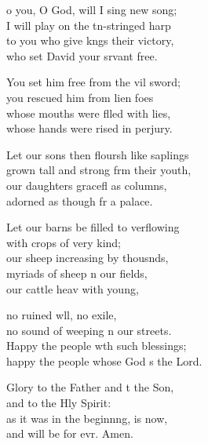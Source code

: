 \settowidth{\versewidth}{Let our sons then flourish like saplings *}
\begin{psalmverse}%
  \begin{patverse}
o you, O God, will I sing  new song;\Med\\
I will play on the tn-stringed harp\\
to you who give k\pointup{\i}ngs their victory,\Med\\
who set David your srvant free.

You set him free from the vil sword;\Med\\
you rescued him from lien foes\\
whose mouths were f\pointup{\i}lled with lies,\Med\\
whose hands were rised in perjury.

Let our sons then flour\pointup{\i}sh like saplings\Med\\
grown tall and strong frm their youth,\\
our daughters gracefl as columns,\Med\\
adorned as though fr a palace.

Let our barns be filled to verflowing\Med\\
with crops of very kind;\\
our sheep increasing by thousnds,\Flex\\
myriads of sheep \pointup{\i}n our fields,\Med\\
our cattle heav with young,

no ruined wll, no exile,\Med\\
no sound of weeping \pointup{\i}n our streets.\\
Happy the people w\pointup{\i}th such blessings;\Med\\
happy the people whose God \pointup{\i}s the Lord.

Glory to the Father and t the Son,\Med\\
and to the Hly Spirit:\\
as it was in the beginn\pointup{\i}ng, is now,\Med\\
and will be for evr. Amen.
  \end{patverse}
\end{psalmverse}
